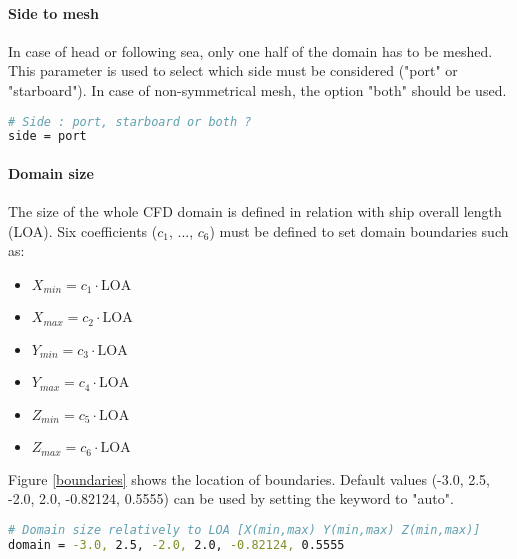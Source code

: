 \paragraph{Side to mesh}
In case of head or following sea, only one half of the domain has to be meshed. This parameter is used to select which side must be considered ("port" or "starboard"). In case of non-symmetrical mesh, the option "both" should be used.
\begin{lstlisting}[language=bash]
# Side : port, starboard or both ?
side = port
\end{lstlisting}

\paragraph{Domain size}
The size of the whole CFD domain is defined in relation with ship overall length (LOA). Six coefficients ($c_1$, ..., $c_6$) must be defined to set domain boundaries such as:
\begin{itemize}
\item $X_{min}= c_1 \cdot \text{LOA}$
\item $X_{max}= c_2 \cdot \text{LOA}$
\item $Y_{min}= c_3 \cdot \text{LOA}$
\item $Y_{max}= c_4 \cdot \text{LOA}$
\item $Z_{min}= c_5 \cdot \text{LOA}$
\item $Z_{max}= c_6 \cdot \text{LOA}$
\end{itemize}
Figure \ref{boundaries} shows the location of boundaries. Default values (-3.0, 2.5, -2.0, 2.0, -0.82124, 0.5555) can be used by setting the keyword to "auto".
\begin{lstlisting}[language=bash]
# Domain size relatively to LOA [X(min,max) Y(min,max) Z(min,max)]
domain = -3.0, 2.5, -2.0, 2.0, -0.82124, 0.5555
\end{lstlisting}


